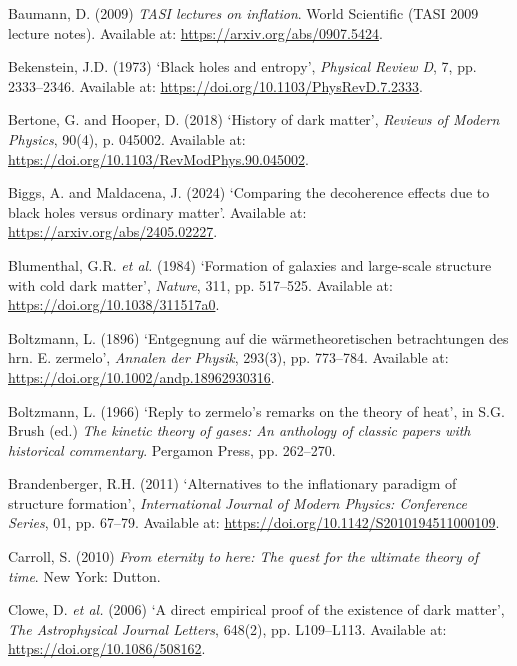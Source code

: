 \documentclass[
]{article}
\newlength{\cslhangindent}
\newenvironment{CSLReferences}[2] %
 {\begin{list}{}{%
  \setlength{\itemindent}{0pt}
  \setlength{\leftmargin}{0pt}
  \setlength{\parsep}{0pt}
  \ifodd #1
   \setlength{\leftmargin}{\cslhangindent}
   \setlength{\itemindent}{-1\cslhangindent}
  \fi
  \setlength{\itemsep}{#2\baselineskip}}}
 {\end{list}}
\begin{document}
\protect{}\label{refs}
\begin{CSLReferences}{0}{1}
Baumann, D. (2009) \emph{TASI lectures on inflation}. World Scientific
(TASI 2009 lecture notes). Available at:
\url{https://arxiv.org/abs/0907.5424}.

Bekenstein, J.D. (1973) {`Black holes and entropy'}, \emph{Physical
Review D}, 7, pp. 2333--2346. Available at:
\url{https://doi.org/10.1103/PhysRevD.7.2333}.

Bertone, G. and Hooper, D. (2018) {`History of dark matter'},
\emph{Reviews of Modern Physics}, 90(4), p. 045002. Available at:
\url{https://doi.org/10.1103/RevModPhys.90.045002}.

Biggs, A. and Maldacena, J. (2024) {`Comparing the decoherence effects
due to black holes versus ordinary matter'}. Available at:
\url{https://arxiv.org/abs/2405.02227}.

Blumenthal, G.R. \emph{et al.} (1984) {`Formation of galaxies and
large-scale structure with cold dark matter'}, \emph{Nature}, 311, pp.
517--525. Available at: \url{https://doi.org/10.1038/311517a0}.

Boltzmann, L. (1896) {`Entgegnung auf die w{ä}rmetheoretischen
betrachtungen des hrn. E. zermelo'}, \emph{Annalen der Physik}, 293(3),
pp. 773--784. Available at:
\url{https://doi.org/10.1002/andp.18962930316}.

Boltzmann, L. (1966) {`Reply to zermelo's remarks on the theory of
heat'}, in S.G. Brush (ed.) \emph{The kinetic theory of gases: An
anthology of classic papers with historical commentary}. Pergamon Press,
pp. 262--270.

Brandenberger, R.H. (2011) {`Alternatives to the inflationary paradigm
of structure formation'}, \emph{International Journal of Modern Physics:
Conference Series}, 01, pp. 67--79. Available at:
\url{https://doi.org/10.1142/S2010194511000109}.

Carroll, S. (2010) \emph{From eternity to here: The quest for the
ultimate theory of time}. New York: Dutton.

Clowe, D. \emph{et al.} (2006) {`A direct empirical proof of the
existence of dark matter'}, \emph{The Astrophysical Journal Letters},
648(2), pp. L109--L113. Available at:
\url{https://doi.org/10.1086/508162}.


\end{CSLReferences}
\end{document}

